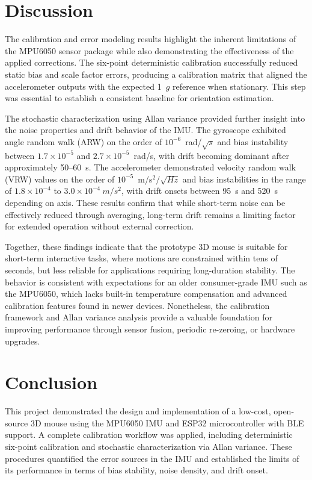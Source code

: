 \documentclass[10pt]{article}
\begin{document}
\section*{Discussion}

The calibration and error modeling results highlight the inherent limitations of 
the MPU6050 sensor package while also demonstrating the effectiveness of the 
applied corrections. The six-point deterministic calibration successfully reduced 
static bias and scale factor errors, producing a calibration matrix that aligned 
the accelerometer outputs with the expected 1~$g$ reference when stationary. 
This step was essential to establish a consistent baseline for orientation 
estimation.

The stochastic characterization using Allan variance provided further insight 
into the noise properties and drift behavior of the IMU. The gyroscope exhibited 
angle random walk (ARW) on the order of $10^{-6}$~rad/$\sqrt{s}$ and bias 
instability between $1.7\times10^{-5}$ and $2.7\times10^{-5}$~rad/s, 
with drift becoming dominant after approximately 50--60~s. The accelerometer 
demonstrated velocity random walk (VRW) values on the order of
$10^{-5}$~m/s$^2/\sqrt{Hz}$ and bias instabilities in the range of 
$1.8\times10^{-4}$ to $3.0\times10^{-4}~m/s^2$, with drift onsets between 95~s 
and 520~s depending on axis. These results confirm that while short-term noise 
can be effectively reduced through averaging, long-term drift remains a limiting 
factor for extended operation without external correction.

Together, these findings indicate that the prototype 3D mouse is suitable for 
short-term interactive tasks, where motions are constrained within tens of 
seconds, but less reliable for applications requiring long-duration stability. 
The behavior is consistent with expectations for an older consumer-grade IMU such 
as the MPU6050, which lacks built-in temperature compensation and advanced 
calibration features found in newer devices. Nonetheless, the calibration 
framework and Allan variance analysis provide a valuable foundation for improving 
performance through sensor fusion, periodic re-zeroing, or hardware upgrades.

\section*{Conclusion}

This project demonstrated the design and implementation of a low-cost, 
open-source 3D mouse using the MPU6050 IMU and ESP32 microcontroller with BLE 
support. A complete calibration workflow was applied, including deterministic 
six-point calibration and stochastic characterization via Allan variance. These 
procedures quantified the error sources in the IMU and established the limits of 
its performance in terms of bias stability, noise density, and drift onset.
\end{document}
